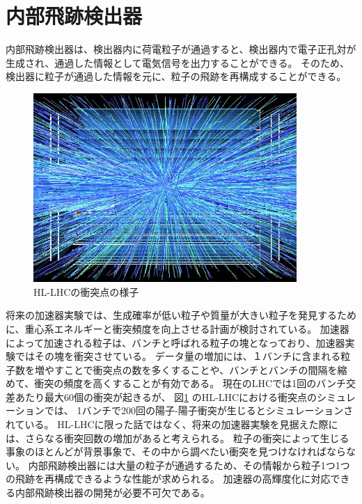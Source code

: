 \section{内部飛跡検出器}
内部飛跡検出器は、検出器内に荷電粒子が通過すると、検出器内で電子正孔対が生成され、通過した情報として電気信号を出力することができる。
そのため、検出器に粒子が通過した情報を元に、粒子の飛跡を再構成することができる。

\begin{figure}[h]
    \centering
    \includegraphics[width=10cm]{fig/ch1/HL-LHC_simulation.jpeg}
    \caption{HL-LHCの衝突点の様子\cite{HL-LHCsimulation}}
    \label{fg:HL-LHCsimulation}
\end{figure}

将来の加速器実験では、生成確率が低い粒子や質量が大きい粒子を発見するために、重心系エネルギーと衝突頻度を向上させる計画が検討されている。
加速器によって加速される粒子は、バンチと呼ばれる粒子の塊となっており、加速器実験ではその塊を衝突させている。
データ量の増加には、１バンチに含まれる粒子数を増やすことで衝突点の数を多くすることや、バンチとバンチの間隔を縮めて、衝突の頻度を高くすることが有効である。
現在のLHCでは1回のバンチ交差あたり最大60個の衝突が起きるが、
図\ref{fg:HL-LHCsimulation} のHL-LHCにおける衝突点のシミュレーション\cite{HL-LHCsimulation}では、
1バンチで200回の陽子-陽子衝突が生じるとシミュレーションされている。
HL-LHCに限った話ではなく、将来の加速器実験を見据えた際には、さらなる衝突回数の増加があると考えられる。
粒子の衝突によって生じる事象のほとんどが背景事象で、その中から調べたい衝突を見つけなければならない。
内部飛跡検出器には大量の粒子が通過するため、その情報から粒子1つ1つの飛跡を再構成できるような性能が求められる。
加速器の高輝度化に対応できる内部飛跡検出器の開発が必要不可欠である。

